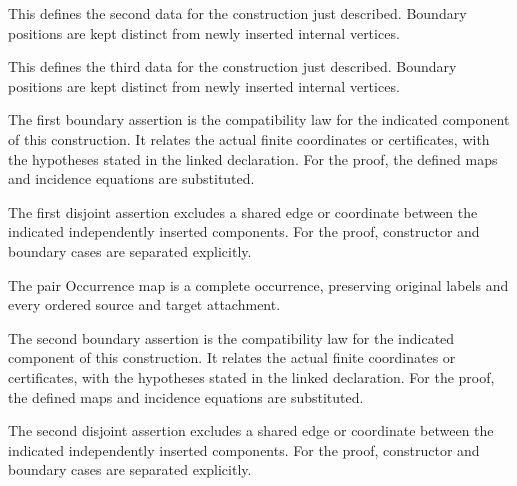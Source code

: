 This defines the second data for the construction just described. Boundary positions are kept distinct from newly inserted internal vertices.
\par{}

This defines the third data for the construction just described. Boundary positions are kept distinct from newly inserted internal vertices.
\par{}

The first boundary assertion is the compatibility law for the indicated component of this construction. It relates the actual finite coordinates or certificates, with the hypotheses stated in the linked declaration.
For the proof, the defined maps and incidence equations are substituted.
\par{}

The first disjoint assertion excludes a shared edge or coordinate between the indicated independently inserted components.
For the proof, constructor and boundary cases are separated explicitly.
\par{}

The pair Occurrence map is a complete occurrence, preserving original labels and every ordered source and target attachment.
\par{}

The second boundary assertion is the compatibility law for the indicated component of this construction. It relates the actual finite coordinates or certificates, with the hypotheses stated in the linked declaration.
For the proof, the defined maps and incidence equations are substituted.
\par{}

The second disjoint assertion excludes a shared edge or coordinate between the indicated independently inserted components.
For the proof, constructor and boundary cases are separated explicitly.
\par{}

